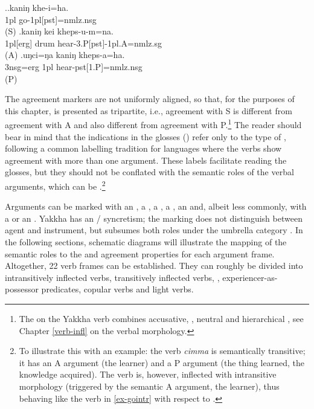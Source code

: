 \ex.\ag.\label{ex-gointr}kaniŋ khe-i=ha.\\
{\sc 1pl} go{\sc -1pl[pst]=nmlz.nsg}\\
 (S)
\bg.kaniŋ kei kheps-u-m=na.\\
{\sc 1pl[erg]} drum hear{\sc -3.P[pst]-1pl.A=nmlz.sg}\\
 (A)
\bg.uŋci=ŋa kaniŋ kheps-a=ha.\\
{\sc 3nsg=erg} {\sc 1pl}  hear{\sc -pst[1.P]=nmlz.nsg}\\
 (P)


The agreement markers are not uniformly aligned, so that, for the purposes of this chapter,  is  presented as tripartite, i.e., agreement with S is different from agreement with A and also different from agreement with P.\footnote{The  on the Yakkha verb combines accusative, , neutral and hierarchical , see Chapter \ref{verb-infl} on the verbal morphology.} The reader should bear in mind that the indications in the glosses () refer only to the type of , following a common labelling tradition for languages where the verbs show agreement with more than one argument. These labels facilitate reading  the glosses, but they should not be conflated with the semantic roles of the verbal arguments, which can be .\footnote{To illustrate this with an example: the verb \emph{cimma}  is semantically transitive; it has an A argument (the learner) and a P argument (the thing learned, the knowledge acquired). The verb  is, however, inflected with intransitive morphology (triggered by the semantic A argument, the learner), thus behaving like the verb in  \ref{ex-gointr} with respect to .} 

Arguments can be marked with an , a , a , a , an  and, albeit less commonly, with a  or an . Yakkha has an / syncretism; the  marking does not distinguish between agent and instrument, but subsumes both roles under the umbrella category  \citep{VanValinetal1996The-case}. In the following sections, schematic diagrams will illustrate the mapping of the semantic roles to the  and agreement properties for each argument frame. Altogether, 22 verb frames can be established. They can roughly be divided into intransitively inflected verbs, transitively inflected verbs, , experiencer-as-possessor predicates, copular verbs and light verbs.


